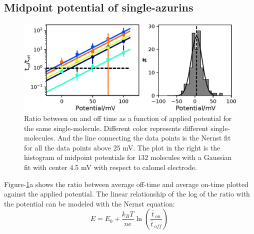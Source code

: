 \documentclass[journal=jacsat,manuscript=article]{achemso}
\newcommand*\me[1]{\ensuremath{\bar{#1}\,}}
\begin{document}
\subsection{Midpoint potential of single-azurins}
\begin{figure}
	\centering
	\includegraphics[]{Figure_2_midpoint.eps}
	\caption{Ratio between on and off time as a function of applied potential for the same single-molecule. Different color represents different single-molecules. And the line connecting the data points is the Nernst fit for all the data points above 25 mV. The plot in the right is the histogram of midpoint potentials for $132$ molecules with a Gaussian fit with center 4.5 mV with respect to calomel electrode.}
	\label{fig:midpoint}
\end{figure}
Figure-\ref{fig:midpoint}a shows the ratio between average off-time and average on-time plotted against the applied potential. The linear relationship of the log of the ratio with the potential can be modeled with the Nernst equation: 
\begin{equation}
	E = E_0 + \frac{k_BT}{n e}\ln\left(\frac{\me{t}_{on}}{\me{t}_{off}}\right)\,
	\label{eq:nernst}
\end{equation}
\end{document}
